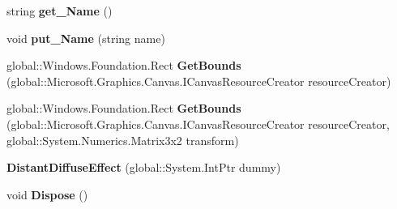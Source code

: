 \begin{DoxyCompactItemize}
\item 
\mbox{\label{class_microsoft_1_1_graphics_1_1_canvas_1_1_effects_1_1_distant_diffuse_effect_a6dc57439b132a8d68fdbf24deed274f8}} 
string {\bfseries get\+\_\+\+Name} ()
\item 
\mbox{\label{class_microsoft_1_1_graphics_1_1_canvas_1_1_effects_1_1_distant_diffuse_effect_a793a85913c14d1fd90f31d8419e31304}} 
void {\bfseries put\+\_\+\+Name} (string name)
\item 
\mbox{\label{class_microsoft_1_1_graphics_1_1_canvas_1_1_effects_1_1_distant_diffuse_effect_a1cb8c03778e97d9bc464859b2d31a0f9}} 
global\+::\+Windows.\+Foundation.\+Rect {\bfseries Get\+Bounds} (global\+::\+Microsoft.\+Graphics.\+Canvas.\+I\+Canvas\+Resource\+Creator resource\+Creator)
\item 
\mbox{\label{class_microsoft_1_1_graphics_1_1_canvas_1_1_effects_1_1_distant_diffuse_effect_a285663b04cb7fc7b35148015b81d8e72}} 
global\+::\+Windows.\+Foundation.\+Rect {\bfseries Get\+Bounds} (global\+::\+Microsoft.\+Graphics.\+Canvas.\+I\+Canvas\+Resource\+Creator resource\+Creator, global\+::\+System.\+Numerics.\+Matrix3x2 transform)
\item 
\mbox{\label{class_microsoft_1_1_graphics_1_1_canvas_1_1_effects_1_1_distant_diffuse_effect_a22bc8ecf39b5603009d3e448ec80f51e}} 
{\bfseries Distant\+Diffuse\+Effect} (global\+::\+System.\+Int\+Ptr dummy)
\item 
\mbox{\label{class_microsoft_1_1_graphics_1_1_canvas_1_1_effects_1_1_distant_diffuse_effect_ac2c02091c4129fd0d1920421b4a2d61c}} 
void {\bfseries Dispose} ()
\item 
\mbox{\label{class_microsoft_1_1_graphics_1_1_canvas_1_1_effects_1_1_distant_diffuse_effect_a98e18ca607a8980f03052a0b7395d04d}} 

\end{DoxyCompactItemize}
